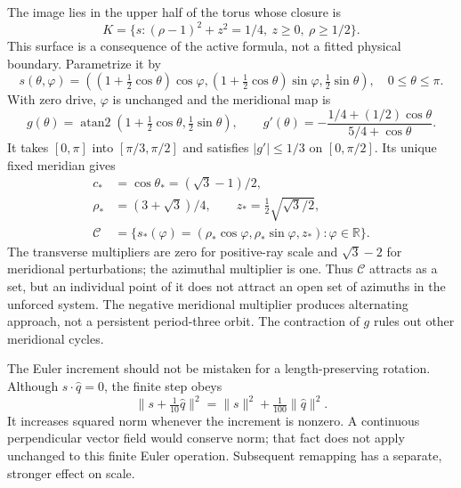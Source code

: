 \documentclass[11pt,a4paper]{article}
\numberwithin{equation}{section}
\newcommand{\R}{\mathbb R}
\newcommand{\Cset}{\mathcal C}
\newcommand{\atanTwo}{\operatorname{atan2}}
\begin{document}
The image lies in the upper half of the torus whose closure is
\begin{equation}\label{eq:torus}
K=\{s:(\rho-1)^2+z^2=1/4,\ z\ge0,\ \rho\ge1/2\}.
\end{equation}
This surface is a consequence of the active formula, not a fitted physical boundary. Parametrize it by
\begin{equation}\label{eq:torusparam}
s(\theta,\varphi)=((1+\tfrac12\cos\theta)\cos\varphi,
(1+\tfrac12\cos\theta)\sin\varphi,\tfrac12\sin\theta),\quad 0\le\theta\le\pi.
\end{equation}
With zero drive, $\varphi$ is unchanged and the meridional map is
\begin{equation}\label{eq:g}
g(\theta)=\atanTwo(1+\tfrac12\cos\theta,\tfrac12\sin\theta),\qquad
g'(\theta)=-\frac{1/4+(1/2)\cos\theta}{5/4+\cos\theta}.
\end{equation}
It takes $[0,\pi]$ into $[\pi/3,\pi/2]$ and satisfies $|g'|\le1/3$ on $[0,\pi/2]$. Its unique fixed meridian gives
\begin{equation}\label{eq:circle}
\begin{aligned}
c_*&=\cos\theta_*=(\sqrt3-1)/2,\\
\rho_*&=(3+\sqrt3)/4,\qquad z_*=\tfrac12\sqrt{\sqrt3/2},\\
\Cset&=\{s_*(\varphi)=(\rho_*\cos\varphi,\rho_*\sin\varphi,z_*):\varphi\in\R\}.
\end{aligned}
\end{equation}
The transverse multipliers are zero for positive-ray scale and $\sqrt3-2$ for meridional perturbations; the azimuthal multiplier is one. Thus $\Cset$ attracts as a set, but an individual point of it does not attract an open set of azimuths in the unforced system. The negative meridional multiplier produces alternating approach, not a persistent period-three orbit. The contraction of $g$ rules out other meridional cycles.

The Euler increment should not be mistaken for a length-preserving rotation. Although $s\cdot\widehat q=0$, the finite step obeys
\begin{equation}\label{eq:eulernorm}
\|s+\tfrac1{10}\widehat q\|^2=\|s\|^2+\tfrac1{100}\|\widehat q\|^2.
\end{equation}
It increases squared norm whenever the increment is nonzero. A continuous perpendicular vector field would conserve norm; that fact does not apply unchanged to this finite Euler operation. Subsequent remapping has a separate, stronger effect on scale.
\end{document}
